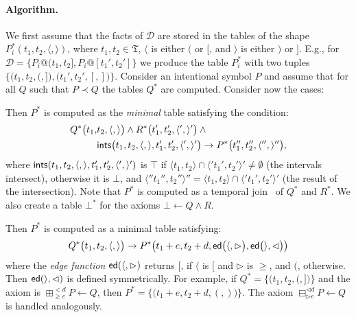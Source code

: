 \documentclass{article}
\newcommand{\D}{\mathcal{D}}
\begin{document}
{{\paragraph{Algorithm.}
  We first assume that the facts of $\D$ are stored in the tables of the shape $P_i^*(t_1, t_2, \langle, \rangle)$, where $t_1, t_2 \in \mathfrak{T}$, $\langle$ is either $($ or $[$, and $\rangle$ is either $)$ or $]$. E.g., for $\D = \{P_i@(t_1, t_2], P_i@[t_1', t_2'] \}$ we produce the table $P_i^*$ with two tuples $\{\bigl(t_1, t_2, (, ]\bigr), \bigl(t_1', t_2', [, ]\bigr) \}$. Consider an intentional symbol $P$ and assume that for all $Q$ such that $P \prec Q$ the tables $Q^*$ are computed. Consider now the cases:
%

\smallskip
{} Then $P^*$ is computed as the \emph{minimal} table satisfying the condition:
      \begin{align*}
  Q^*\bigl(t_1, &t_2, \langle , \rangle\bigr)  \land  R^*\bigl(t_1', t_2', \langle' , \rangle'\bigr)  \land{} \\
  &{\sf ints}\bigl(t_1, t_2, \langle , \rangle, t_1', t_2', \langle' , \rangle'\bigr) \to
    P^*\bigl(t_1'', t_2'', \langle'', \rangle''\bigr),
\end{align*}
%
where ${\sf ints}(t_1, t_2, \langle , \rangle, t_1', t_2', \langle' , \rangle')$ is $\top$ if $\langle t_1, t_2 \rangle \cap \langle' t_1', t_2' \rangle' \neq \emptyset$ (the intervals intersect), otherwise it is $\bot$, and $\langle'' t_1'', t_2'' \rangle'' = \langle t_1, t_2 \rangle \cap \langle' t_1', t_2' \rangle'$ (the result of the  intersection). Note that $P^*$ is computed as a temporal join~\cite{Gao2005} of $Q^*$ and $R^*$. We also create a table $\bot^*$ for the axioms $\bot \leftarrow Q \land R$.

\smallskip
{} Then $P^*$ is computed as a minimal table satisfying:
%
\begin{align*}
  Q^*\bigl(t_1, t_2, \langle , \rangle\bigr) \to P^*\bigl(t_1+e, t_2+d, {\sf ed}\bigl(\langle, \rhd\bigr), {\sf ed}\bigl(\rangle, \lhd\bigr)\bigr)
\end{align*}
%
where the \emph{edge function} ${\sf ed}(\langle, \rhd)$ returns $[$, if $\langle$ is $[$ and $\rhd$ is $\geqslant$, and $($, otherwise. Then ${\sf ed}(\rangle, \lhd)$ is defined symmetrically. For example, if $Q^* = \{ \bigl(t_1, t_2, (, ]\bigr)\}$ and the axiom is $\boxplus^{< d}_{\geqslant e} P \leftarrow Q$, then $P^* = \{ \bigl(t_1+e, t_2+d, (, )\bigr)\}$. The axiom $\boxminus^{\lhd d}_{\rhd e} P \leftarrow Q$ is handled analogously.

}}
\end{document}
